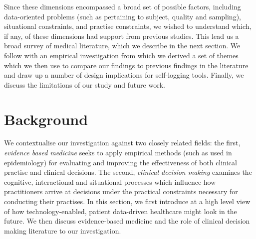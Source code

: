 \documentclass{sigchi}
\begin{document}
Since these dimensions encompassed a broad set of possible factors, including data-oriented problems (such as pertaining to subject, quality and sampling), situational constraints, and practise constraints, we wished to understand which, if any, of these dimensions had support from previous studies.  This lead us a broad survey of medical literature, which we describe in the next section. We follow with an empirical investigation from which we derived a set of themes which we then use to compare our findings to previous findings in the literature and draw up a number of design implications for self-logging tools.  Finally, we discuss the limitations of our study and future work.






\section{Background} 

We contextualise our investigation against two closely related fields: the first, \emph{evidence based medicine} seeks to apply empirical methods (such as used in epidemiology) for evaluating and improving the effectiveness of both clinical practise and clinical decisions.  The second, \emph{clinical decision making} examines the cognitive, interactional and situational processes which influence how practitioners arrive at decisions under the practical constraints necessary for conducting their practises.  In this section, we first introduce at a high level view of how technology-enabled, patient data-driven healthcare might look in the future.  We then discuss evidence-based medicine and the role of clinical decision making literature to our investigation.
\end{document}
